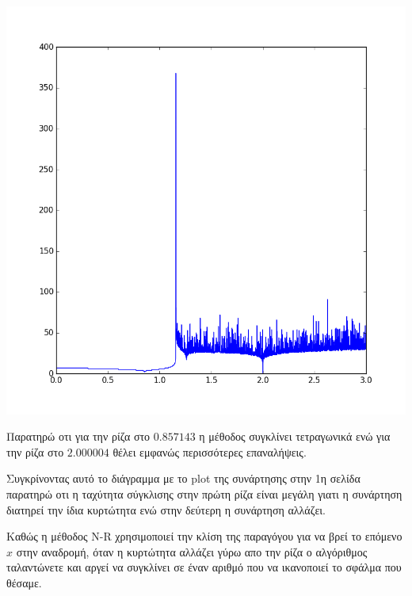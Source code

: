 \begin{center}
  \includegraphics[scale = 0.7]{ex1/starting_point-loops.png}
\end{center}

Παρατηρώ οτι για την ρίζα στο $0.857143$ η μέθοδος συγκλίνει τετραγωνικά
ενώ για την ρίζα στο $2.000004$ θέλει εμφανώς περισσότερες επαναλήψεις.

Συγκρίνοντας αυτό το διάγραμμα με το plot της συνάρτησης στην 1η σελίδα
παρατηρώ οτι η ταχύτητα σύγκλισης στην πρώτη ρίζα είναι μεγάλη γιατι η
συνάρτηση διατηρεί την ίδια κυρτώτητα ενώ στην δεύτερη η συνάρτηση αλλάζει.

Καθώς η μέθοδος N-R χρησιμοποιεί την κλίση της παραγόγου για να βρεί το
επόμενο $x$ στην αναδρομή, όταν η κυρτώτητα αλλάζει γύρω απο την ρίζα
ο αλγόριθμος ταλαντώνετε και αργεί να συγκλίνει σε έναν αριθμό που να ικανοποιεί
το σφάλμα που θέσαμε.
